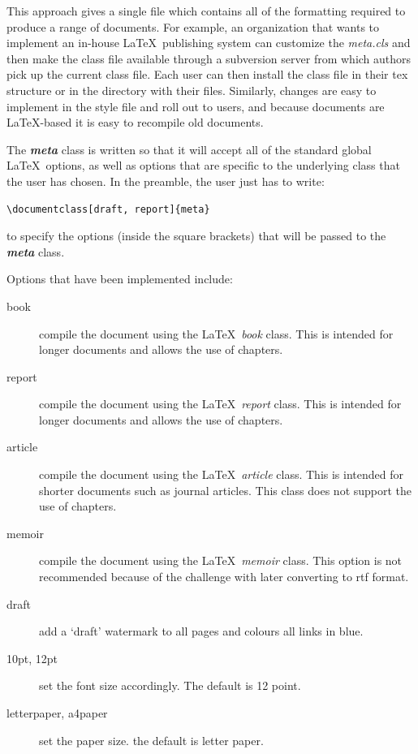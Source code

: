 \documentclass[12pt,letterpaper]{article}
\newcommand{\fn}[1]{\emph{#1}}
\newcommand{\packagename}[1]{\textbf{\emph{#1}}}
\begin{document}
This approach gives a single file which contains all of the formatting required to produce a range of documents. For example, an organization that wants to implement an in-house \LaTeX\ publishing system can customize the \fn{meta.cls} and then make the class file available through a subversion server from which authors pick up the current class file. Each user can then install the class file in their tex structure or in the directory with their files. Similarly, changes are easy to implement in the style file and roll out to users, and because documents are \LaTeX-based it is easy to recompile old documents.

The \packagename{meta} class is written so that it will accept all of the standard global \LaTeX\ options, as well as options that are specific to the underlying class that the user has chosen. In the preamble, the user just has to write:

\begin{verbatim}
\documentclass[draft, report]{meta}
\end{verbatim}

\noindent to specify the options (inside the square brackets) that will be passed to the \packagename{meta} class. 

Options that have been implemented include:
\begin{description}
\item[book]{compile the document using the \LaTeX\ \emph{book} class. This is intended for longer documents and allows the use of chapters.}
\item[report]{compile the document using the \LaTeX\ \emph{report} class. This is intended for longer documents and allows the use of chapters.}
\item[article]{compile the document using the \LaTeX\ \emph{article} class. This is intended for shorter documents such as journal articles. This class does not support the use of chapters.}
\item[memoir]{compile the document using the \LaTeX\ \emph{memoir} class. This option is not recommended because of the challenge with later converting to rtf format.}
\item[draft]{add a `draft' watermark to all pages and colours all links in blue.}
\item[10pt, 12pt]{set the font size accordingly. The default is 12 point.}
\item[letterpaper, a4paper]{set the paper size. the default is letter paper.}
\end{description}
\end{document}
